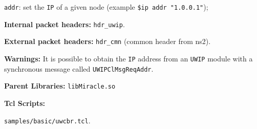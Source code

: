 \begin{description}
\begin{description}
     \item {\tt addr}: set the {\tt IP} of a given node (example {\tt \$ip addr "1.0.0.1"});
    \end{description}
   \item {\bf Internal packet headers:} {\tt hdr\_uwip}.
   \item {\bf External packet headers:} {\tt hdr\_cmn} (common header from ns2).
   \item {\bf Warnings:} It is possible to obtain the {\tt IP} address from an {\tt UWIP} module with a synchronous message called {\tt UWIPClMsgReqAddr}.
   \item {\bf Parent Libraries:} {\tt libMiracle.so}
   \item {\bf Tcl Scripts:} 
   \begin{description}
   \item {\tt samples/basic/uwcbr.tcl}.
   \end{description}
\end{description}
